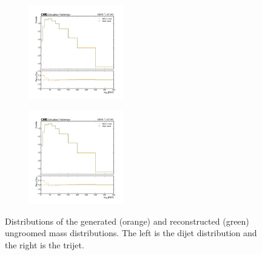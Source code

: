   \begin{figure}[h!]
    \centering
    	\begin{subfigure}
		\centering
		\includegraphics[width=0.45\textwidth]{figures/multijet/dijet/genreco_mjet.png}
              \end{subfigure}%
         \begin{subfigure}
		\centering
		\includegraphics[width=0.45\textwidth]{figures/multijet/dijet/genreco_mjet.png}
	\end{subfigure}%
    \caption{Distributions of the generated (orange) and reconstructed (green) ungroomed mass distributions. The left is the dijet distribution and the right is the trijet.}
    \label{fig:genreco}
  \end{figure}
